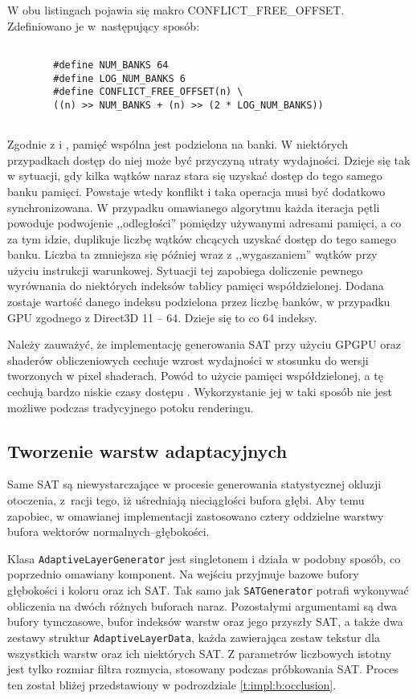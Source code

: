 		W obu listingach pojawia się makro CONFLICT\_FREE\_OFFSET. Zdefiniowano je w~następujący sposób:
		
		\begin{lstlisting}[language=HLSL,caption={Makro CONFLICT\_FREE\_OFFSET.},label={lst_6_J}]
		
		#define NUM_BANKS 64
		#define LOG_NUM_BANKS 6
		#define CONFLICT_FREE_OFFSET(n) \
		((n) >> NUM_BANKS + (n) >> (2 * LOG_NUM_BANKS))
		
		\end{lstlisting}
		
		Zgodnie z \cite{sat} i \cite{directcompute}, pamięć wspólna jest podzielona na banki. W niektórych przypadkach dostęp do niej może być przyczyną utraty wydajności. Dzieje się tak w sytuacji, gdy kilka wątków naraz stara się uzyskać dostęp do tego samego banku pamięci. Powstaje wtedy konflikt i taka operacja musi być dodatkowo synchronizowana. W przypadku omawianego algorytmu każda iteracja pętli powoduje podwojenie ,,odległości'' pomiędzy używanymi adresami pamięci, a co za tym idzie, duplikuje liczbę wątków chcących uzyskać dostęp do tego samego banku. Liczba ta zmniejsza się później wraz z ,,wygaszaniem'' wątków przy użyciu instrukcji warunkowej. Sytuacji tej zapobiega doliczenie pewnego wyrównania do niektórych indeksów tablicy pamięci współdzielonej. Dodana zostaje wartość danego indeksu podzielona przez liczbę banków, w przypadku GPU zgodnego z Direct3D 11 -- 64. Dzieje się to co 64 indeksy.
		
		Należy zauważyć, że implementację generowania SAT przy użyciu GPGPU oraz shaderów obliczeniowych cechuje wzrost wydajności w stosunku do wersji tworzonych w pixel shaderach. Powód to użycie pamięci współdzielonej, a tę cechują bardzo niskie czasy dostępu \cite{sat}. Wykorzystanie jej w taki sposób nie jest możliwe podczas tradycyjnego potoku renderingu.
		
	\subsection{Tworzenie warstw adaptacyjnych}
	\label{t:impl:b:adaptive}
	
		Same SAT są niewystarczające w procesie generowania statystycznej okluzji otoczenia, z~racji tego, iż uśredniają nieciągłości bufora głębi. Aby temu zapobiec, w omawianej implementacji zastosowano cztery oddzielne warstwy bufora wektorów normalnych--głębokości. 
		
		Klasa \texttt{AdaptiveLayerGenerator} jest singletonem i działa w podobny sposób, co poprzednio omawiany komponent. Na wejściu przyjmuje bazowe bufory głębokości i koloru oraz ich SAT. Tak samo jak \texttt{SATGenerator} potrafi wykonywać obliczenia na dwóch różnych buforach naraz. Pozostałymi argumentami są dwa bufory tymczasowe, bufor indeksów warstw oraz jego przyszły SAT, a także dwa zestawy struktur \texttt{AdaptiveLayerData}, każda zawierająca zestaw tekstur dla wszystkich warstw oraz ich niektórych SAT. Z parametrów liczbowych istotny jest tylko rozmiar filtra rozmycia, stosowany podczas próbkowania SAT. Proces ten został bliżej przedstawiony w podrozdziale \ref{t:impl:b:occlusion}.
		
